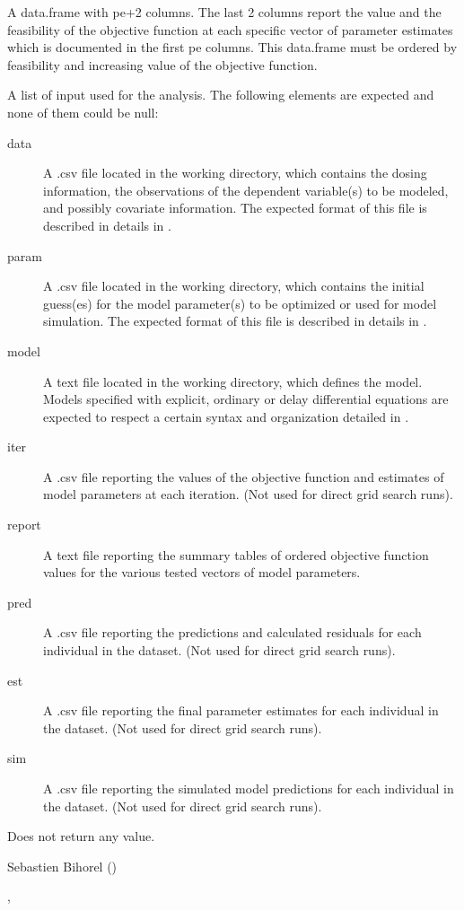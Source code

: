 \begin{Arguments}
\begin{ldescription}
\begin{description}
\end{description}


\item[\code{fgrid}] A data.frame with pe+2 columns. The last 2 columns report the
value and the feasibility of the objective function at each specific vector of 
parameter estimates which is documented in the first pe columns. This 
data.frame must be ordered by feasibility and increasing value of the objective
function.
\item[\code{files}] A list of input used for the analysis. The following elements are
expected and none of them could be null: \begin{description}

\item[data] A .csv file located in the working directory, which contains
the dosing information, the observations of the dependent variable(s)
to be modeled, and possibly covariate information. The expected format 
of this file is described in details in .
\item[param] A .csv file located in the working directory, which contains
the initial guess(es) for the model parameter(s) to be optimized or used
for model simulation. The expected format of this file is described in
details in .
\item[model] A text file located in the working directory, which defines 
the model. Models specified with explicit, ordinary or delay 
differential equations are expected to respect a certain syntax and 
organization detailed in .
\item[iter] A .csv file reporting the values of the objective function
and estimates of model parameters at each iteration. (Not used for
direct grid search runs).
\item[report] A text file reporting the summary tables of ordered 
objective function values for the various tested vectors of model 
parameters.
\item[pred] A .csv file reporting the predictions and calculated residuals
for each individual in the dataset. (Not used for direct grid search 
runs).
\item[est] A .csv file reporting the final parameter estimates for each
individual in the dataset. (Not used for direct grid search runs).
\item[sim] A .csv file reporting the simulated model predictions for each 
individual in the dataset. (Not used for direct grid search runs).

\end{description}


\end{ldescription}
\end{Arguments}
%
\begin{Value}
Does not return any value.
\end{Value}
%
\begin{Author}\relax
Sebastien Bihorel ()
\end{Author}
%
\begin{SeeAlso}\relax
{},
\end{SeeAlso}
